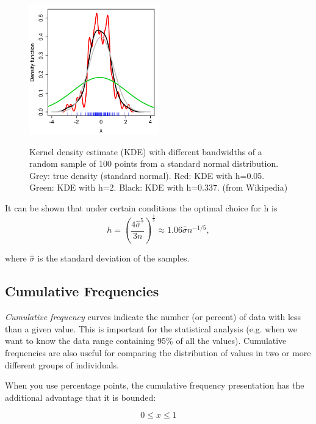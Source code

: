 \begin{figure}[ht]
  \centering
  \includegraphics[width=0.5\textwidth]{../Images/Comparison_of_1D_bandwidth_selectors.png}\\
  \caption{Kernel density estimate (KDE) with different bandwidths of a random sample of 100 points from a standard normal distribution. Grey: true density (standard normal). Red: KDE with h=0.05. Green: KDE with h=2. Black: KDE with h=0.337. (from Wikipedia)}
\end{figure}

It can be shown that under certain conditions the optimal choice for h is
\begin{equation}
  h = \left(\frac{4\hat{\sigma}^5}{3n}\right)^{\frac{1}{5}} \approx 1.06 \hat{\sigma} n^{-1/5},
\end{equation}


where $\hat{\sigma}$ is the standard deviation of the samples.


\subsection{Cumulative Frequencies}

\emph{Cumulative frequency} curves indicate the number (or percent) of data with less than a given value. This is important for the statistical analysis (e.g. when we want to know the data range containing 95\% of all the values). Cumulative frequencies
are also useful for comparing the distribution of values in two or more different groups of individuals.

When you use percentage points, the cumulative frequency presentation has the additional advantage that it is bounded:

\begin{equation*}
  0 \leq x \leq 1
\end{equation*}


